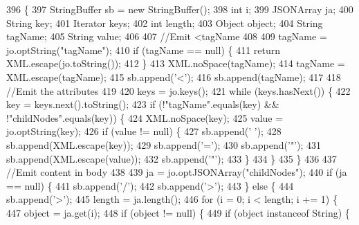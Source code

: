 \begin{DoxyCode}
396                                                                       \{
397         StringBuffer sb = \textcolor{keyword}{new} StringBuffer();
398         \textcolor{keywordtype}{int}          i;
399         JSONArray    ja;
400         String       key;
401         Iterator     keys;
402         \textcolor{keywordtype}{int}          length;
403         Object         object;
404         String       tagName;
405         String       value;
406 
407 \textcolor{comment}{//Emit <tagName}
408 
409         tagName = jo.optString(\textcolor{stringliteral}{"tagName"});
410         \textcolor{keywordflow}{if} (tagName == null) \{
411             \textcolor{keywordflow}{return} XML.escape(jo.toString());
412         \}
413         XML.noSpace(tagName);
414         tagName = XML.escape(tagName);
415         sb.append(\textcolor{charliteral}{'<'});
416         sb.append(tagName);
417 
418 \textcolor{comment}{//Emit the attributes}
419 
420         keys = jo.keys();
421         \textcolor{keywordflow}{while} (keys.hasNext()) \{
422             key = keys.next().toString();
423             \textcolor{keywordflow}{if} (!\textcolor{stringliteral}{"tagName"}.equals(key) && !\textcolor{stringliteral}{"childNodes"}.equals(key)) \{
424                 XML.noSpace(key);
425                 value = jo.optString(key);
426                 \textcolor{keywordflow}{if} (value != null) \{
427                     sb.append(\textcolor{charliteral}{' '});
428                     sb.append(XML.escape(key));
429                     sb.append(\textcolor{charliteral}{'='});
430                     sb.append(\textcolor{charliteral}{'"'});
431                     sb.append(XML.escape(value));
432                     sb.append(\textcolor{charliteral}{'"'});
433                 \}
434             \}
435         \}
436 
437 \textcolor{comment}{//Emit content in body}
438 
439         ja = jo.optJSONArray(\textcolor{stringliteral}{"childNodes"});
440         \textcolor{keywordflow}{if} (ja == null) \{
441             sb.append(\textcolor{charliteral}{'/'});
442             sb.append(\textcolor{charliteral}{'>'});
443         \} \textcolor{keywordflow}{else} \{
444             sb.append(\textcolor{charliteral}{'>'});
445             length = ja.length();
446             \textcolor{keywordflow}{for} (i = 0; i < length; i += 1) \{
447                 \textcolor{keywordtype}{object} = ja.get(i);
448                 \textcolor{keywordflow}{if} (\textcolor{keywordtype}{object} != null) \{
449                     \textcolor{keywordflow}{if} (\textcolor{keywordtype}{object} instanceof String) \{

\end{DoxyCode}
